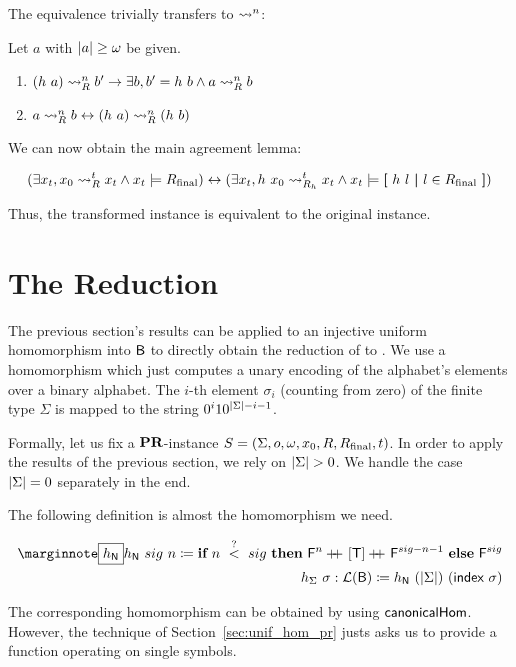 The equivalence trivially transfers to $\rightsquigarrow_{}^n$: 
\begin{lemma}
  Let $a$ with $|a| \ge \omega$ be given.
  \begin{enumerate}
    \item $(h~a) \rightsquigarrow_{R}^n b' \rightarrow \exists b, b' = h~b \land a \rightsquigarrow_{R}^n b$
    \item $a \rightsquigarrow_{R}^n b \leftrightarrow (h~a) \rightsquigarrow_{R}^n (h~b)$
\end{enumerate}
\end{lemma}

We can now obtain the main agreement lemma:
\begin{lemma}\label{lem:hom_pr_equiv}
  \[(\exists x_t, x_0 \rightsquigarrow_{R}^t x_t \land x_t \models R_{\text{final}}) \leftrightarrow (\exists x_t, h~x_0 \rightsquigarrow_{R_h}^t x_t \land x_t \models \textbf{[}~ h~l ~\textbf{|}~ l \in R_{\text{final}} ~\textbf{]}) \]
\end{lemma}
Thus, the transformed \PR{} instance is equivalent to the original instance.

\section{The Reduction}
The previous section's results can be applied to an injective uniform homomorphism into $\textsf{B}$ to directly obtain the reduction of \PR{} to \BPR{}. 
We use a homomorphism which just computes a unary encoding of the alphabet's elements over a binary alphabet. The $i$-th element $\sigma_i$ (counting from zero) of the finite type $\Sigma$ is mapped to the string $0^i10^{|\Sigma|-i-1}$.

Formally, let us fix a $\textbf{PR}{}$-instance $S = (\Sigma, o, \omega, x_0, R, R_{\text{final}}, t)$. In order to apply the results of the previous section, we rely on $|\Sigma| > 0$. We handle the case $|\Sigma| = 0$ separately in the end.

The following definition is almost the homomorphism we need. 
\begin{definition}\label{def:hnat_hsig}
  \begin{align*}
    \mnote{$h_{\nat}$}
    h_{\nat}~sig~n\defeq \ITE{n~\overset{?}{<}~sig}{\bfalse^n \concat [\btrue] \concat \bfalse^{sig -n -1}}{\bfalse^{sig}} \\
    h_{\Sigma}~\sigma : \listsof{\bool} \defeq h_{\nat}~(\length{\Sigma})~(\textsf{index}~\sigma)
  \end{align*}
\end{definition}
The corresponding homomorphism can be obtained by using $\textsf{canonicalHom}$. However, the technique of Section~\ref{sec:unif_hom_pr} justs asks us to provide a function operating on single symbols.

